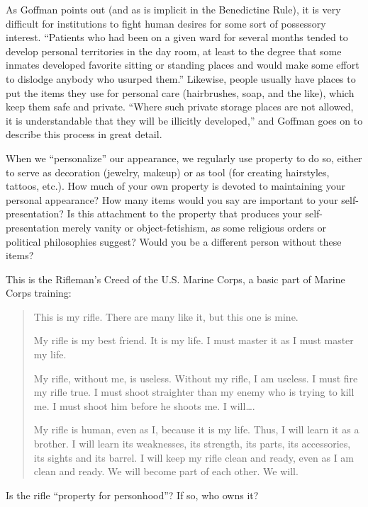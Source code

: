 As Goffman points out (and as is implicit in the Benedictine Rule), it is very
difficult for institutions to fight human desires for some sort of possessory
interest.  {}``Patients who had been on a given ward for several months tended
to develop personal territories in the day room, at least to the degree that
some inmates developed favorite sitting or standing places and would make some
effort to dislodge anybody who usurped them.''  Likewise, people usually have
places to put the items they use for personal care (hairbrushes, soap, and the
like), which keep them safe and private. ``Where such private storage places
are not allowed, it is understandable that they will be illicitly developed,''
and Goffman goes on to describe this process in great detail.

When we ``personalize'' our appearance, we regularly use property to do so,
either to serve as decoration (jewelry, makeup) or as tool (for creating
hairstyles, tattoos, etc.).  How much of your own property is devoted to
maintaining your personal appearance?  How many items would you say are
important to your self-presentation?  Is this attachment to the property that
produces your self-presentation merely vanity or object-fetishism, as some
religious orders or political philosophies suggest?  Would you be a different
person without these items?

This is the Rifleman's Creed of the U.S. Marine Corps, a basic part of Marine
Corps training:

\begin{quotation}
This is my rifle. There are many like it, but this one is mine.

My rifle is my best friend. It is my life. I must master it as I must master my
life.

My rifle, without me, is useless. Without my rifle, I am useless. I must fire my
rifle true. I must shoot straighter than my enemy who is trying to kill me. I
must shoot him before he shoots me. I will{\dots}. 

My rifle is human, even as I, because it is my life. Thus, I will learn it as a
brother. I will learn its weaknesses, its strength, its parts, its accessories,
its sights and its barrel. I will keep my rifle clean and ready, even as I am
clean and ready. We will become part of each other.  We will.
\end{quotation}

Is the rifle ``property for personhood''?  If so, who owns it?
